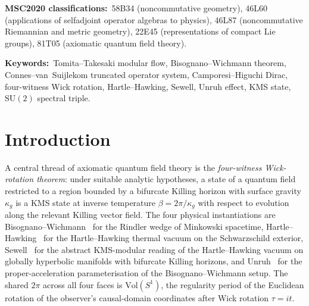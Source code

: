 \documentclass[11pt,a4paper]{article}
\theoremstyle{plain}
\theoremstyle{definition}
\newcommand{\sthree}{S^{3}}
\newcommand{\SU}{\mathrm{SU}}
\newcommand{\Vol}{\mathrm{Vol}}
\begin{document}
\begin{abstract}
prescription, isolating $H_{\mathrm{local}} = K_\alpha^W / \beta$ as a
derived structural finding. The L1 closure lifts the four-witness
theorem from ``structural correspondence'' (the published
Wick-rotation chain at the metric-functional level) to ``literal
identification at the operator-system level (Riemannian)'' at every
finite cutoff. The Lorentzian extension to signature $(3, 1)$ via
Bizi--Brouder--Besnard~2018~\cite{bizi_brouder_besnard2018}
Krein-space spectral triples remains the named multi-month follow-up.
The result is the metric-spectral-triple analog of the Connes--Rovelli
thermal time hypothesis~\cite{connes_rovelli1994} restricted to a
hemispheric wedge of the round $\sthree$.
\end{abstract}

\bigskip\noindent
\textbf{MSC2020 classifications:}\ 58B34 (noncommutative geometry),
46L60 (applications of selfadjoint operator algebras to physics),
46L87 (noncommutative Riemannian and metric geometry),
22E45 (representations of compact Lie groups),
81T05 (axiomatic quantum field theory).

\medskip\noindent
\textbf{Keywords:}\ Tomita--Takesaki modular flow, Bisognano--Wichmann
theorem, Connes--van~Suijlekom truncated operator system,
Camporesi--Higuchi Dirac, four-witness Wick rotation,
Hartle--Hawking, Sewell, Unruh effect, KMS state, $\SU(2)$ spectral
triple.

\section{Introduction}\label{sec:intro}

A central thread of axiomatic quantum field theory is the
\emph{four-witness Wick-rotation theorem}: under suitable analytic
hypotheses, a state of a quantum field restricted to a region
bounded by a bifurcate Killing horizon with surface gravity
$\kappa_g$ is a KMS state at inverse temperature
$\beta = 2\pi / \kappa_g$ with respect to evolution along the
relevant Killing vector field. The four physical instantiations are
Bisognano--Wichmann~\cite{bisognano_wichmann1976} for the Rindler
wedge of Minkowski spacetime, Hartle--Hawking~\cite{hartle_hawking1976}
for the Hartle--Hawking thermal vacuum on the Schwarzschild exterior,
Sewell~\cite{sewell1982} for the abstract KMS-modular reading of the
Hartle--Hawking vacuum on globally hyperbolic manifolds with bifurcate
Killing horizons, and Unruh~\cite{unruh1976} for the proper-acceleration
parameterisation of the Bisognano--Wichmann setup. The shared $2\pi$
across all four faces is $\Vol(S^1)$, the regularity period of the
Euclidean rotation of the observer's causal-domain coordinates after
Wick rotation $\tau = i t$.
\end{document}
